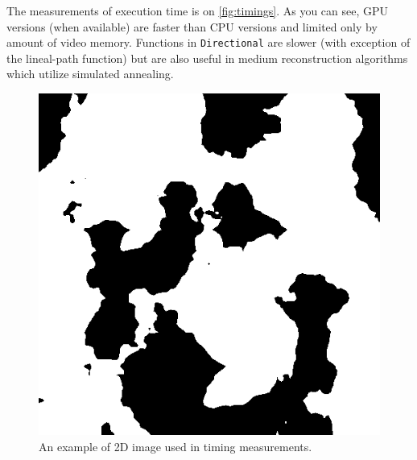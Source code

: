 \documentclass[reprint,amsmath,amssymb,aps,pre,nofootinbib]{revtex4-1}
\newcommand{\code}[1]{\colorbox{light-gray}{\texttt{#1}}}
\begin{document}
The measurements of execution time is on \cref{fig:timings}. As you can see, GPU
versions (when available) are faster than CPU versions and limited only by
amount of video memory. Functions in \code{Directional} are slower (with
exception of the lineal-path function) but are also useful in medium
reconstruction algorithms which utilize simulated annealing.

\begin{figure}[ht]
  \centering
  \includegraphics[width=0.9\linewidth]{images/timing-image.png}
  \caption[]{An example of 2D image used in timing measurements.}
  \label{fig:valuenoise}
\end{figure}
\end{document}
